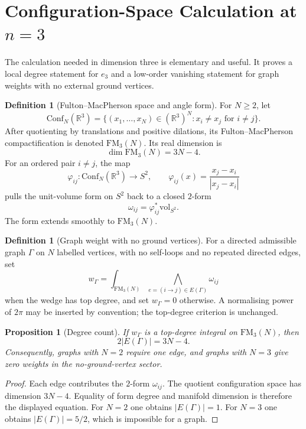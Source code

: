 \documentclass[11pt]{amsart}
\newtheorem{proposition}[theorem]{Proposition}
\theoremstyle{definition}
\newtheorem{definition}[theorem]{Definition}
\theoremstyle{remark}
\providecommand{\RR}{\mathbb{R}}
\providecommand{\Conf}{\mathrm{Conf}}
\providecommand{\FM}{\mathrm{FM}}
\providecommand{\GraphEdges}{E}
\providecommand{\vol}{\mathrm{vol}}
\begin{document}
\section{Configuration-Space Calculation at \(n=3\)}
\label{sec:configuration}

The calculation needed in dimension three is elementary and useful.
It proves a local degree statement for \(e_3\) and a low-order
vanishing statement for graph weights with no external ground
vertices.

\begin{definition}[Fulton--MacPherson space and angle form]
\label{def:fm-angle}
For \(N\geq 2\), let
\[
  \Conf_N(\RR^3)=\{(x_1,\ldots,x_N)\in(\RR^3)^N:x_i\neq x_j
  \text{ for } i\neq j\}.
\]
After quotienting by translations and positive dilations, its
Fulton--MacPherson compactification is denoted \(\FM_3(N)\).  Its real
dimension is
\[
  \dim \FM_3(N)=3N-4.
\]
For an ordered pair \(i\neq j\), the map
\[
  \varphi_{ij}\colon \Conf_N(\RR^3)\longrightarrow S^2,\qquad
  \varphi_{ij}(x)=\frac{x_j-x_i}{|x_j-x_i|}
\]
pulls the unit-volume form on \(S^2\) back to a closed \(2\)-form
\[
  \omega_{ij}=\varphi_{ij}^{*}\vol_{S^2}.
\]
The form extends smoothly to \(\FM_3(N)\).
\end{definition}

\begin{definition}[Graph weight with no ground vertices]
\label{def:graph-weight}
For a directed admissible graph \(\Gamma\) on \(N\) labelled vertices,
with no self-loops and no repeated directed edges, set
\[
  w_\Gamma =
  \int_{\FM_3(N)} \bigwedge_{e=(i\to j)\in \GraphEdges(\Gamma)}\omega_{ij}
\]
when the wedge has top degree, and set \(w_\Gamma=0\) otherwise.  A
normalising power of \(2\pi\) may be inserted by convention; the
top-degree criterion is unchanged.
\end{definition}

\begin{proposition}[Degree count]
\label{prop:degree-count}
If \(w_\Gamma\) is a top-degree integral on \(\FM_3(N)\), then
\[
  2|\GraphEdges(\Gamma)|=3N-4.
\]
Consequently, graphs with \(N=2\) require one edge, and graphs with
\(N=3\) give zero weights in the no-ground-vertex sector.
\end{proposition}

\begin{proof}
Each edge contributes the \(2\)-form \(\omega_{ij}\).  The quotient
configuration space has dimension \(3N-4\).  Equality of form degree and
manifold dimension is therefore the displayed equation.  For \(N=2\)
one obtains \(|\GraphEdges(\Gamma)|=1\).  For \(N=3\) one obtains
\(|\GraphEdges(\Gamma)|=5/2\), which is impossible for a graph.
\end{proof}
\end{document}
